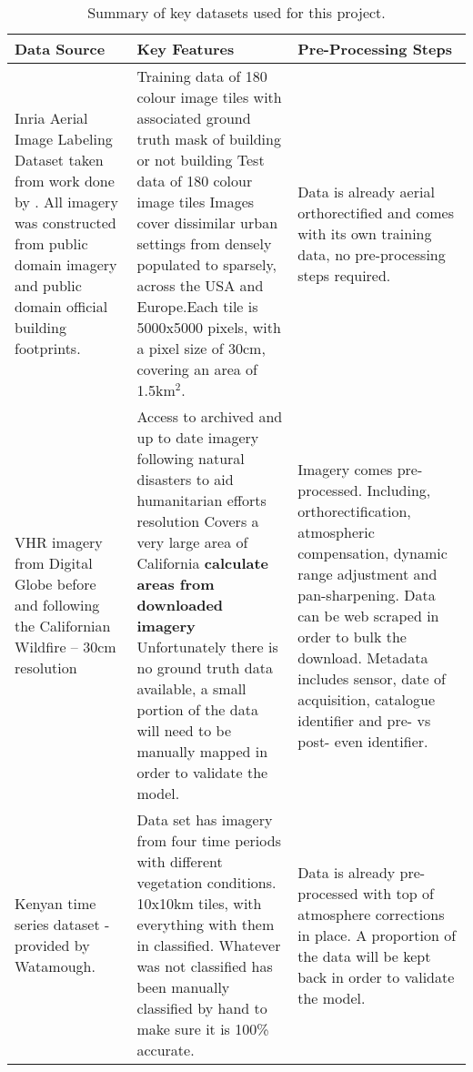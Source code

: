 \begin{sidewaystable}
    \centering
    \caption{Summary of key datasets used for this project.}
\begin{tabular}{ p{2.4in} p{3.3in} p{2.6in} }\toprule
\textbf{Data Source}& \textbf{Key Features} & \textbf{Pre-Processing Steps} \\ \toprule
Inria Aerial Image Labeling Dataset taken from work done by \cite{maggiori17a}. All imagery was constructed from public domain imagery and public domain official building footprints. &Training data of 180 colour image tiles with associated ground truth mask of building or not building \newline Test data of 180 colour image tiles \newline Images cover dissimilar urban settings from densely populated to sparsely, across the USA and Europe.\newline Each tile is 5000x5000 pixels, with a pixel size of 30cm, covering an area of 1.5km$^2$. 
& Data is already aerial orthorectified and comes with its own training data, no pre-processing steps required.  \\ \midrule
VHR imagery from Digital Globe before and following the Californian Wildfire – 30cm resolution&
Access to archived and up to date imagery following natural disasters to aid humanitarian efforts \newline
30cm resolution \newline
Covers a very large area of California \textbf{calculate areas from downloaded imagery} \newline
Unfortunately there is no ground truth data available, a small portion of the data will need to be manually mapped in order to validate the model.
& Imagery comes pre-processed. Including, orthorectification, atmospheric compensation, dynamic range adjustment and pan-sharpening. \newline
Data can be web scraped in order to bulk the download.\newline
Metadata includes sensor, date of acquisition, catalogue identifier and pre- vs post- even identifier.
\\ \midrule
Kenyan time series dataset - provided by Watamough.& 
Data set has imagery from four time periods with different vegetation conditions. \newline
10x10km tiles, with everything with them in classified. Whatever was not classified has been manually classified by hand to make sure it is 100\% accurate. \newline &
Data is already pre-processed with top of atmosphere corrections in place. A proportion of the data will be kept back in order to validate the model.\\ \bottomrule
\end{tabular}
\label{tab.datasets}
\end{sidewaystable}
